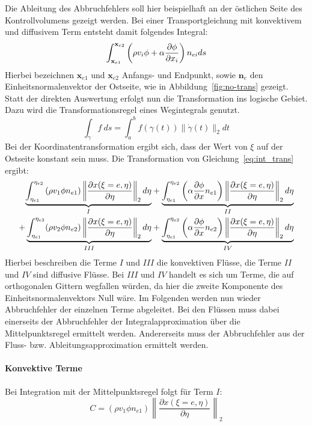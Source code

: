 Die Ableitung des Abbruchfehlers soll hier beispielhaft an der östlichen Seite des Kontrollvolumens
gezeigt werden. Bei einer Transportgleichung mit konvektivem und diffusivem Term entsteht damit folgendes
Integral:
\begin{equation}
  \int_{\mathbf{x}_{e1}}^{\mathbf{x}_{e2}}\left({\rho v_i\phi+\alpha \pder[\phi]{x_i}}\right)n_{ei}ds
  \label{eq:int_trans}
\end{equation}
Hierbei bezeichnen $\mathbf{x}_{e1}$ und $\mathbf{x}_{e2}$ Anfangs- und Endpunkt, sowie $\mathbf{n}_e$
den Einheitsnormalenvektor der Ostseite, wie in Abbildung~\ref{fig:no-trans} gezeigt.
Statt der direkten Auswertung erfolgt nun die Transformation ins logische Gebiet. Dazu wird die
Transformationsregel eines Wegintegrals genutzt.
\begin{equation}
  \int_{\gamma}f\ ds=\int_a^bf(\gamma (t)) \lVert \dot{\gamma}(t)\rVert_2 dt
\end{equation}
Bei der Koordinatentransformation ergibt sich, dass der Wert von $\xi$ auf der Ostseite konstant sein muss.
Die Transformation von Gleichung~\eqref{eq:int_trans} ergibt:
\begin{align*}
  \underbrace{
    \int_{\eta_{e1}}^{\eta_{e2}} \left({\rho v_1 \phi n_{e1}}\right)
  \left\lVert \frac{\partial x(\xi=e, \eta)}{\partial \eta} \right\rVert_2 d\eta
  }_I
  &+ \underbrace{
  \int_{\eta_{e1}}^{\eta_{e2}} \left({\alpha \pder[\phi]{x} n_{e1}}\right)
  \left\lVert \frac{\partial x(\xi=e, \eta)}{\partial \eta} \right\rVert_2 d\eta
}_{II}\\
  + \underbrace{
  \int_{\eta_{e1}}^{\eta_{e2}} (\rho v_2 \phi n_{e2})
  \left\lVert \frac{\partial x(\xi=e, \eta)}{\partial \eta} \right\rVert_2 d\eta
  }_{III}
  &+ \underbrace{
  \int_{\eta_{e1}}^{\eta_{e2}} \left({\alpha \pder[\phi]{x} n_{e2}}\right)
  \left\lVert \frac{\partial x(\xi=e, \eta)}{\partial \eta} \right\rVert_2 d\eta
  }_{IV}
\end{align*}
Hierbei beschreiben die Terme $I$ und $III$ die konvektiven Flüsse, die Terme $II$ und $IV$ sind
diffusive Flüsse. Bei $III$ und $IV$ handelt es sich um Terme, die auf orthogonalen Gittern wegfallen würden,
da hier die zweite Komponente des Einheitsnormalenvektors Null wäre.
Im Folgenden werden nun wieder Abbruchfehler der einzelnen Terme abgeleitet. Bei den Flüssen muss dabei
einerseits der Abbruchfehler der Integralapproximation über die Mittelpunktsregel ermittelt werden.
Andererseits muss der Abbruchfehler aus der Fluss- bzw. Ableitungsapproximation ermittelt werden.
\paragraph{Konvektive Terme}
Bei Integration mit der Mittelpunktsregel folgt für Term $I$:
\begin{equation*}
  C=(\rho v_1 \phi n_{e1})
  \left\lVert \frac{\partial x(\xi=e, \eta)}{\partial \eta} \right\rVert_2
\end{equation*}

